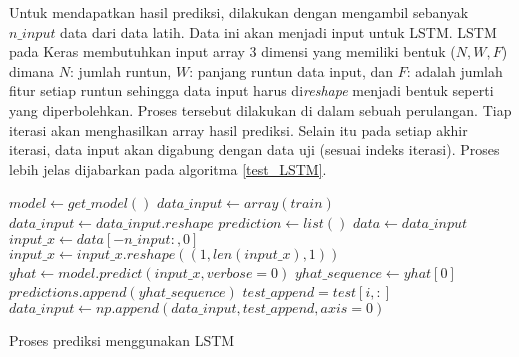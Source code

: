 \documentclass[../thesis.tex]{subfiles}
\begin{document}
Untuk mendapatkan hasil prediksi, dilakukan dengan mengambil sebanyak $n\_input$ data dari data latih. Data ini akan menjadi input untuk LSTM. LSTM pada Keras membutuhkan input array 3 dimensi yang memiliki bentuk ($N, W, F$) dimana $N$: jumlah runtun, $W$: panjang runtun data input, dan $F$: adalah jumlah fitur setiap runtun sehingga data input harus di\textit{reshape} menjadi bentuk seperti yang diperbolehkan.
Proses tersebut dilakukan di dalam sebuah perulangan. Tiap iterasi akan menghasilkan array hasil prediksi. Selain itu pada setiap akhir iterasi, data input akan digabung dengan data uji (sesuai indeks iterasi). Proses lebih jelas dijabarkan pada algoritma \ref{test_LSTM}.
\begin{algorithm}[htp]
	\begin{algorithmic}[1]
		\State $model \leftarrow get\_model()$
		\State $data\_input \leftarrow array(train)$
		\State $data\_input \leftarrow data\_input.reshape$
		\State $prediction \leftarrow list()$
			\State $data \leftarrow data\_input$
			\State $input\_x \leftarrow data[-n\_input:,0]$
			\State $input\_x \leftarrow input\_x.reshape((1, len(input\_x), 1))$
			\State $yhat \leftarrow model.predict(input\_x, verbose=0)$
			\State $yhat\_sequence \leftarrow yhat[0]$
			\State $predictions.append(yhat\_sequence)$
			\State $test\_append = test[i, :]$
			\State $data\_input \leftarrow np.append(data\_input, test\_append, axis=0)$
		\EndFor
	\EndFunction
	\end{algorithmic}
	\caption{Proses prediksi menggunakan LSTM}
	\label{test_LSTM}
\end{algorithm}
\end{document}
